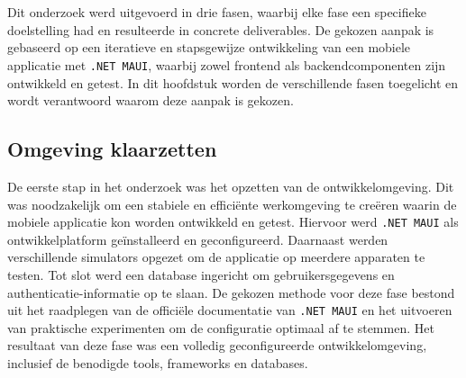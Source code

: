 
\chapter{}%
\label{ch:methodologie}


Dit onderzoek werd uitgevoerd in drie fasen, waarbij elke fase een specifieke doelstelling had en resulteerde in concrete deliverables. De gekozen aanpak is gebaseerd op een iteratieve en stapsgewijze ontwikkeling van een mobiele applicatie met \texttt{.NET MAUI}, waarbij zowel frontend als backendcomponenten zijn ontwikkeld en getest. In dit hoofdstuk worden de verschillende fasen toegelicht en wordt verantwoord waarom deze aanpak is gekozen.

\section{Omgeving klaarzetten}

De eerste stap in het onderzoek was het opzetten van de ontwikkelomgeving. Dit was noodzakelijk om een stabiele en efficiënte werkomgeving te creëren waarin de mobiele applicatie kon worden ontwikkeld en getest. Hiervoor werd \texttt{.NET MAUI} als ontwikkelplatform geïnstalleerd en geconfigureerd. Daarnaast werden verschillende simulators opgezet om de applicatie op meerdere apparaten te testen. Tot slot werd een database ingericht om gebruikersgegevens en authenticatie-informatie op te slaan. De gekozen methode voor deze fase bestond uit het raadplegen van de officiële documentatie van \texttt{.NET MAUI} en het uitvoeren van praktische experimenten om de configuratie optimaal af te stemmen. Het resultaat van deze fase was een volledig geconfigureerde ontwikkelomgeving, inclusief de benodigde tools, frameworks en databases.


